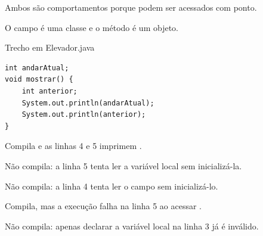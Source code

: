 \documentclass[11pt,a4paper]{article}
\begin{document}
\begin{minipage}[t]{.485\textwidth}
\begin{alternativas}
\item Ambos são comportamentos porque podem ser acessados com ponto.
\item O campo é uma classe e o método é um objeto.
\end{alternativas}
\begin{alternativas}
\item {}
\item {}
\item {}
\item {}
\item {}
\end{alternativas}
\begin{painelEvolucao}{Trecho em Elevador.java}
\begin{lstlisting}[style=cenariocodigo]
int andarAtual;
void mostrar() {
    int anterior;
    System.out.println(andarAtual);
    System.out.println(anterior);
}
\end{lstlisting}
\end{painelEvolucao}
\begin{alternativas}
\item Compila e as linhas 4 e 5 imprimem .
\item Não compila: a linha 5 tenta ler a variável local  sem inicializá-la.
\item Não compila: a linha 4 tenta ler o campo  sem inicializá-lo.
\item Compila, mas a execução falha na linha 5 ao acessar .
\item Não compila: apenas declarar a variável local na linha 3 já é inválido.
\end{alternativas}
\end{minipage}\hfill
\end{document}
